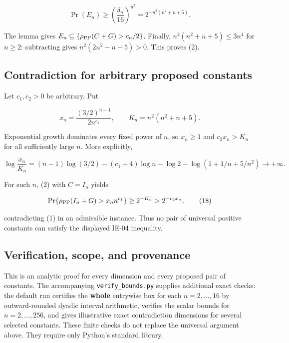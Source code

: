 \documentclass[10pt,a4paper]{article}
\begin{document}
\nopagebreak[4]

\[
\Pr(E_n)\geq\left(\frac{\delta_n}{16}\right)^{n^2}
=2^{-n^2(n^2+n+5)}.
\tag{15}
\]

The lemma gives \(E_n\subseteq\{\rho_{\rm PP}(C+G)>c_n/2\}\). Finally,
\(n^2(n^2+n+5)\leq3n^4\) for \(n\geq2\): subtracting gives
\(n^2(2n^2-n-5)>0\). This proves (2).


\subsection{Contradiction for arbitrary proposed
constants}\label{contradiction-for-arbitrary-proposed-constants}

Let \(c_1,c_2>0\) be arbitrary. Put

\nopagebreak[4]

\[
x_n=\frac{(3/2)^{n-1}}{2n^{c_1}},
\qquad K_n=n^2(n^2+n+5).
\tag{16}
\]

Exponential growth dominates every fixed power of \(n\), so \(x_n\geq1\)
and \(c_2x_n>K_n\) for all sufficiently large \(n\). More explicitly,

\nopagebreak[4]

\[
\log\frac{x_n}{K_n}
=(n-1)\log(3/2)-(c_1+4)\log n-\log2
-\log(1+1/n+5/n^2)\longrightarrow+\infty.
\tag{17}
\]

For such \(n\), (2) with \(C=I_n\) yields

\nopagebreak[4]

\[
\Pr\{\rho_{\rm PP}(I_n+G)>x_nn^{c_1}\}
\geq2^{-K_n}>2^{-c_2x_n},
\tag{18}
\]

contradicting (1) in an admissible instance. Thus no pair of universal
positive constants can satisfy the displayed IE-04 inequality.


\subsection{Verification, scope, and
provenance}\label{verification-scope-and-provenance}

This is an analytic proof for every dimension and every proposed pair of
constants. The accompanying \texttt{verify\_bounds.py} supplies
additional exact checks: the default run certifies the \textbf{whole}
entrywise box for each \(n=2,\ldots,16\) by outward-rounded dyadic
interval arithmetic, verifies the scalar bounds for \(n=2,\ldots,256\),
and gives illustrative exact contradiction dimensions for several
selected constants. These finite checks do not replace the universal
argument above. They require only Python's standard library.
\end{document}
